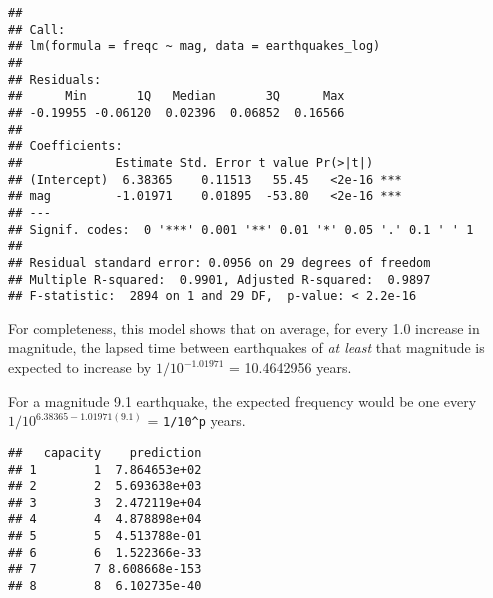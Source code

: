 \begin{verbatim}
## 
## Call:
## lm(formula = freqc ~ mag, data = earthquakes_log)
## 
## Residuals:
##      Min       1Q   Median       3Q      Max 
## -0.19955 -0.06120  0.02396  0.06852  0.16566 
## 
## Coefficients:
##             Estimate Std. Error t value Pr(>|t|)    
## (Intercept)  6.38365    0.11513   55.45   <2e-16 ***
## mag         -1.01971    0.01895  -53.80   <2e-16 ***
## ---
## Signif. codes:  0 '***' 0.001 '**' 0.01 '*' 0.05 '.' 0.1 ' ' 1
## 
## Residual standard error: 0.0956 on 29 degrees of freedom
## Multiple R-squared:  0.9901, Adjusted R-squared:  0.9897 
## F-statistic:  2894 on 1 and 29 DF,  p-value: < 2.2e-16
\end{verbatim}


For completeness, this model shows that on average, for every 1.0
increase in magnitude, the lapsed time between earthquakes of \emph{at
least} that magnitude is expected to increase by \(1/10^{-1.01971}\) =
10.4642956 years.

For a magnitude 9.1 earthquake, the expected frequency would be one
every \(1/10^{6.38365-1.01971(9.1)}\) = \texttt{1/10\^{}p} years.

\begin{Shaded}
\begin{Highlighting}[]
\OtherTok{\textless{}{-}} \SpecialCharTok{:}
\OtherTok{\textless{}{-}} 

\OtherTok{\textless{}{-}} \NormalTok{(}\SpecialCharTok{\textasciitilde{}} 
\OtherTok{\textless{}{-}}  \NormalTok{(} \NormalTok{))}
\OtherTok{\textless{}{-}} \SpecialCharTok{/}\SpecialCharTok{\^{}}
\NormalTok{\}}
\end{Highlighting}
\end{Shaded}

\begin{verbatim}
##   capacity    prediction
## 1        1  7.864653e+02
## 2        2  5.693638e+03
## 3        3  2.472119e+04
## 4        4  4.878898e+04
## 5        5  4.513788e-01
## 6        6  1.522366e-33
## 7        7 8.608668e-153
## 8        8  6.102735e-40
\end{verbatim}

